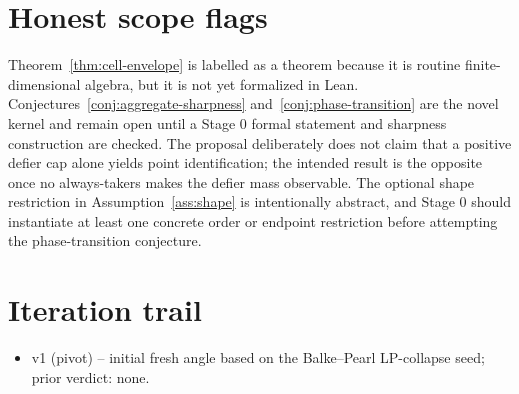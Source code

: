 \documentclass[11pt]{article}
\theoremstyle{definition}
\theoremstyle{plain}
\theoremstyle{remark}
\begin{document}
\section{Honest scope flags}
Theorem~\ref{thm:cell-envelope} is labelled as a theorem because it is routine finite-dimensional algebra, but it is not yet formalized in Lean.  Conjectures~\ref{conj:aggregate-sharpness} and~\ref{conj:phase-transition} are the novel kernel and remain open until a Stage 0 formal statement and sharpness construction are checked.  The proposal deliberately does not claim that a positive defier cap alone yields point identification; the intended result is the opposite once no always-takers makes the defier mass observable.  The optional shape restriction in Assumption~\ref{ass:shape} is intentionally abstract, and Stage 0 should instantiate at least one concrete order or endpoint restriction before attempting the phase-transition conjecture.

\section{Iteration trail}
\begin{itemize}[leftmargin=*]
\item v1 (pivot) -- initial fresh angle based on the Balke--Pearl LP-collapse seed; prior verdict: none.
\end{itemize}
\end{document}
